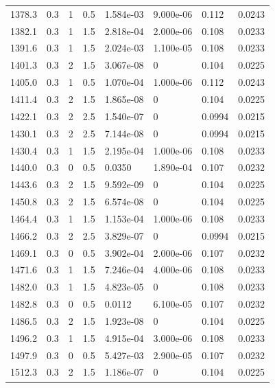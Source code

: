 \documentclass[preview]{standalone}
\begin{document}
{{{{{\begin{tabular}{L{1.2cm}C{1.2cm} C{0.3cm}C{0.5cm} C{1.4cm}C{1.4cm} C{1.4cm}C{1.4cm}}
  1378.3  &   0.3  & 1     & 0.5 &  1.584e-03  & 9.000e-06  & 0.112 &  0.0243   \\ 
  1382.1  &   0.3  & 1     & 1.5 &  2.818e-04  & 2.000e-06  & 0.108 &  0.0233   \\ 
  1391.6  &   0.3  & 1     & 1.5 &  2.024e-03  & 1.100e-05  & 0.108 &  0.0233   \\ 
  1401.3  &   0.3  & 2     & 1.5 &  3.067e-08  & 0  & 0.104 &  0.0225   \\ 
  1405.0  &   0.3  & 1     & 0.5 &  1.070e-04  & 1.000e-06  & 0.112 &  0.0243   \\ 
  1411.4  &   0.3  & 2     & 1.5 &  1.865e-08  & 0  & 0.104 &  0.0225   \\ 
  1422.1  &   0.3  & 2     & 2.5 &  1.540e-07  & 0  & 0.0994 &  0.0215   \\ 
  1430.1  &   0.3  & 2     & 2.5 &  7.144e-08  & 0  & 0.0994 &  0.0215   \\ 
  1430.4  &   0.3  & 1     & 1.5 &  2.195e-04  & 1.000e-06  & 0.108 &  0.0233   \\ 
  1440.0  &   0.3  & 0     & 0.5 &  0.0350  & 1.890e-04  & 0.107 &  0.0232   \\ 
  1443.6  &   0.3  & 2     & 1.5 &  9.592e-09  & 0  & 0.104 &  0.0225   \\ 
  1450.8  &   0.3  & 2     & 1.5 &  6.574e-08  & 0  & 0.104 &  0.0225   \\ 
  1464.4  &   0.3  & 1     & 1.5 &  1.153e-04  & 1.000e-06  & 0.108 &  0.0233   \\ 
  1466.2  &   0.3  & 2     & 2.5 &  3.829e-07  & 0  & 0.0994 &  0.0215   \\ 
  1469.1  &   0.3  & 0     & 0.5 &  3.902e-04  & 2.000e-06  & 0.107 &  0.0232   \\ 
  1471.6  &   0.3  & 1     & 1.5 &  7.246e-04  & 4.000e-06  & 0.108 &  0.0233   \\ 
  1482.0  &   0.3  & 1     & 1.5 &  4.823e-05  & 0  & 0.108 &  0.0233   \\ 
  1482.8  &   0.3  & 0     & 0.5 &  0.0112  & 6.100e-05  & 0.107 &  0.0232   \\ 
  1486.5  &   0.3  & 2     & 1.5 &  1.923e-08  & 0  & 0.104 &  0.0225   \\ 
  1496.2  &   0.3  & 1     & 1.5 &  4.915e-04  & 3.000e-06  & 0.108 &  0.0233   \\ 
  1497.9  &   0.3  & 0     & 0.5 &  5.427e-03  & 2.900e-05  & 0.107 &  0.0232   \\ 
  1512.3  &   0.3  & 2     & 1.5 &  1.186e-07  & 0  & 0.104 &  0.0225   \\ 

\end{tabular}}}}}}
\end{document}

